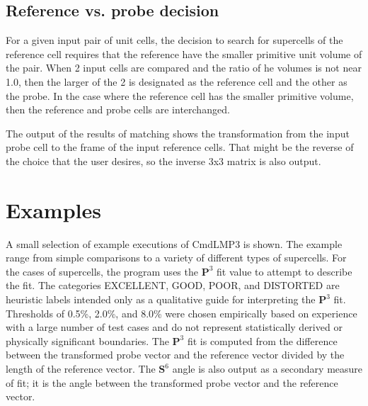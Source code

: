 \documentclass[preprint]{iucr}              %
\numberwithin{equation}{section}
\newcommand{\SVI}{\ensuremath{\mathbf{S}^{6}}}
\newcommand{\PIII}{\ensuremath{\mathbf{P}^{3}}}
\begin{document}
%

\subsection{Reference vs. probe decision}

For a given input pair of unit cells, the decision to 
search for supercells of the reference cell requires
that the reference have the smaller primitive unit
volume of the pair. When 2 input cells are compared
and the ratio of he volumes is not near 1.0, then
the larger of the 2 is designated as the reference
cell and the other as the probe. 
In the case where the reference cell has the smaller 
primitive volume, then the reference and probe cells
are interchanged.

The output of the results of matching
shows the transformation from the input probe cell to
the frame of the input reference cells. That might be
the reverse of the choice that the user desires, so
 the inverse 3x3 matrix is also output.



	



	


	\section{Examples}
	A small selection of example executions of CmdLMP3 is 
	shown. The example range from simple comparisons to
	a variety of different types of supercells. For
	the cases of supercells, the program
	uses the \PIII{} fit value to attempt to describe the fit.
	The categories EXCELLENT, GOOD, POOR, and DISTORTED are heuristic labels intended only as a qualitative guide for interpreting the \PIII{} fit.
	 Thresholds of 0.5\%, 2.0\%, and 8.0\% were chosen empirically based on  experience with a large number of test cases and do not represent statistically derived or physically significant boundaries. 
	 The \PIII{} fit is computed from the
	difference between the transformed probe vector and the reference vector
	divided by the length of the reference vector. The \SVI{} angle
	is also output as a secondary measure of fit; it is the angle
	between the transformed probe vector and the reference  vector.
	
\end{document}
